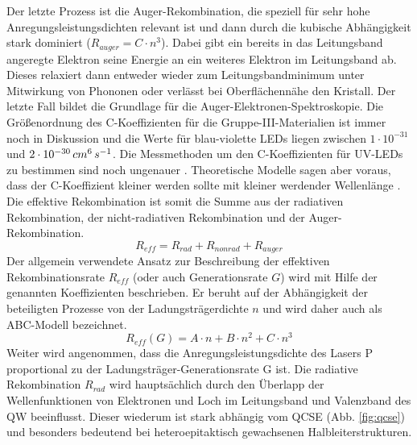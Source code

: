 Der letzte Prozess ist die Auger-Rekombination, die speziell für sehr hohe Anregungsleistungsdichten relevant ist und dann durch die kubische Abhängigkeit stark dominiert ($R_{auger} = C \cdot n^3 $). Dabei gibt ein bereits in das Leitungsband angeregte Elektron seine Energie an ein weiteres Elektron im Leitungsband ab. Dieses relaxiert dann entweder wieder zum Leitungsbandminimum unter Mitwirkung von Phononen oder verlässt bei Oberflächennähe den Kristall. Der letzte Fall bildet die Grundlage für die Auger-Elektronen-Spektroskopie.
Die Größenordnung des C-Koeffizienten für die Gruppe-III-Materialien ist immer noch in Diskussion \cite{8b1c5cf85d5a45e0ae9acca7b03dc349} \cite{doi:10.1063/1.2785135} \cite{doi:10.1002/pssc.200880950} und die Werte für blau-violette LEDs liegen zwischen $1 \cdot 10^{-31}$ und $2 \cdot 10^{-30} \thinspace cm^6 \thinspace s^{-1}$. Die Messmethoden um den C-Koeffizienten für UV-LEDs zu bestimmen sind noch ungenauer \cite{1882-0786-8-2-022104}. Theoretische Modelle sagen aber voraus, dass der C-Koeffizient kleiner werden sollte mit kleiner werdender Wellenlänge \cite{doi:10.1063/1.3570656}.
Die effektive Rekombination ist somit die Summe aus der radiativen Rekombination, der nicht-radiativen Rekombination und der Auger-Rekombination.
\begin{equation}
    R_{eff} = R_{rad} + R_{nonrad} + R_{auger}
    \label{eq:iqe1}
\end{equation}
Der allgemein verwendete Ansatz zur Beschreibung der effektiven Rekombinationsrate $R_{eff}$ (oder auch Generationsrate $G$) wird mit Hilfe der genannten Koeffizienten beschrieben. Er beruht auf der Abhängigkeit der beteiligten Prozesse von der Ladungsträgerdichte $n$ und wird daher auch als ABC-Modell bezeichnet.
\begin{equation}
    R_{eff} (G) = A \cdot n + B \cdot n^2 + C \cdot n^3 
    \label{eq:iqe2}
\end{equation}
Weiter wird angenommen, dass die Anregungsleistungsdichte des Lasers P proportional zu
der Ladungsträger-Generationsrate G ist. Die radiative Rekombination $R_{rad}$ wird hauptsächlich durch den Überlapp der Wellenfunktionen von Elektronen und Loch im Leitungsband und Valenzband des QW beeinflusst. Dieser wiederum ist stark abhängig vom QCSE (Abb. 
\ref{fig:qcse}) und besonders bedeutend bei heteroepitaktisch gewachsenen Halbleiterstrukturen. 
%
